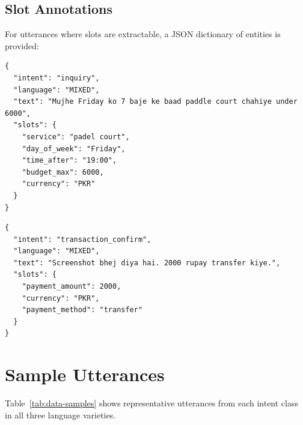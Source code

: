 \subsection{Slot Annotations}

For utterances where slots are extractable, a JSON dictionary of entities is
provided:

\begin{lstlisting}[style=jsonstyle, caption={Sample slot annotation for an inquiry utterance.}]
{
  "intent": "inquiry",
  "language": "MIXED",
  "text": "Mujhe Friday ko 7 baje ke baad paddle court chahiye under 6000",
  "slots": {
    "service": "padel court",
    "day_of_week": "Friday",
    "time_after": "19:00",
    "budget_max": 6000,
    "currency": "PKR"
  }
}
\end{lstlisting}

\begin{lstlisting}[style=jsonstyle, caption={Sample slot annotation for a transaction\_confirm utterance.}]
{
  "intent": "transaction_confirm",
  "language": "MIXED",
  "text": "Screenshot bhej diya hai. 2000 rupay transfer kiye.",
  "slots": {
    "payment_amount": 2000,
    "currency": "PKR",
    "payment_method": "transfer"
  }
}
\end{lstlisting}

\section{Sample Utterances}
\label{app:data-samples}

Table~\ref{tab:data-samples} shows representative utterances from each intent class
in all three language varieties.

